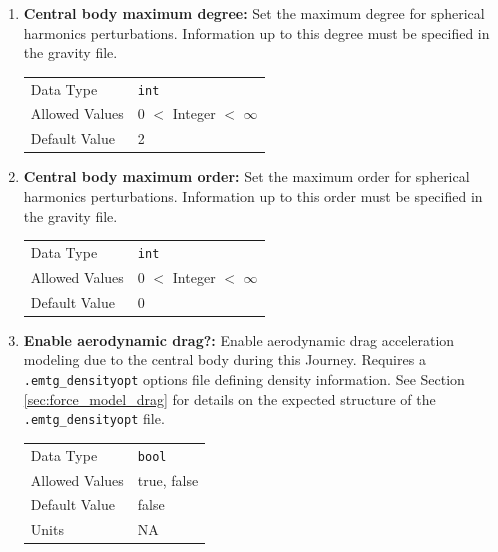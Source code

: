 \begin{enumerate}
            \item \textbf{Central body maximum degree:} Set the maximum degree for spherical harmonics perturbations. Information up to this degree must be specified in the gravity file.

                \begin{table}[H]
                    \hspace{2cm}
                    \begin{tabular}{ll}
                    Data Type & \verb|int| \\
                    Allowed Values & 0 $<$ Integer $<$ $\infty$ \\
                    Default Value & 2 \\             
                    \end{tabular}
                \end{table}
                
                \item \textbf{Central body maximum order:} Set the maximum order for spherical harmonics perturbations. Information up to this order must be specified in the gravity file.

                \begin{table}[H]
                    \hspace{2cm}
                    \begin{tabular}{ll}
                    Data Type & \verb|int| \\
                    Allowed Values & 0 $<$ Integer $<$ $\infty$ \\
                    Default Value & 0 \\
                    \end{tabular}
                \end{table}
    

     
    \item \textbf{Enable aerodynamic drag?:} Enable aerodynamic drag acceleration modeling due to the central body during this Journey. Requires a {\tt .emtg\_densityopt} options file defining density information. See Section \ref{sec:force_model_drag} for details on the expected structure of the {\tt .emtg\_densityopt} file.

        \begin{table}[H]
            \hspace{2cm}
            \begin{tabular}{ll}
            Data Type & \verb|bool| \\
            Allowed Values & true, false \\
            Default Value & false \\
            Units & NA
            \end{tabular}
        \end{table}


\end{enumerate}
